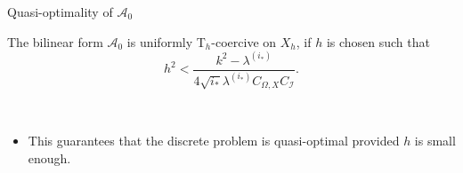 \documentclass[]{beamer}
\newcommand{\oxarrow}{\color{oxfordblue}$\blacktriangleright$}
\begin{document}
	\begin{frame}{Quasi-optimality of $\mathcal{A}_0$}
	\vspace{0.7cm}
	\begin{minipage}{0.6\textwidth}
	\begin{theorem}
		The bilinear form $\mathcal{A}_0$ is uniformly T$_h$-coercive on $X_h$, if $h$ is chosen such that
		\vspace{-0.3cm}
		\begin{equation*}
		h^{2} < \frac{k^2 - \lambda^{(i_{\ast})}}{ 4 \sqrt{i_\ast} \lambda^{(i_\ast)} C_{\Omega,X} C_{\mathcal{I}}}.
		\end{equation*}
	\end{theorem}
	\end{minipage}
	\,
	\begin{minipage}{0.3\textwidth}
	\begin{figure}
	\end{figure}
	\end{minipage}
	\vspace{0.5cm}
	\begin{itemize}
		\item<3->[\oxarrow] This guarantees that the discrete problem is quasi-optimal provided $h$ is small enough.
	\end{itemize}
	\end{frame}
\end{document}
